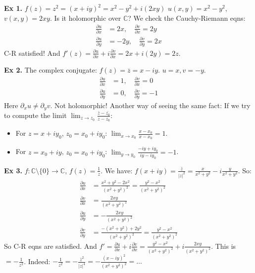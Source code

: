 \begin{example}
\textbf{Ex 1.} $f(z) = z^{2} = (x+iy)^{2} = x^{2} - y^{2} + i(2xy)$
$u(x,y) = x^{2} - y^{2}$, $v(x,y) = 2xy$.
Is it holomorphic over $\mathbb{C}$? We check the Cauchy-Riemann eqns:
\begin{align*}
\frac{\partial u}{\partial x} &= 2x, \quad \frac{\partial v}{\partial x} = 2y \\
\frac{\partial u}{\partial y} &= -2y, \quad \frac{\partial v}{\partial y} = 2x
\end{align*}
C-R satisfied! And $f'(z) = \frac{\partial u}{\partial x} + i\frac{\partial v}{\partial x} = 2x + i(2y) = 2z$.

\textbf{Ex 2.} The complex conjugate: $f(z) = \overline{z} = x - iy$.
$u = x, v = -y$.
\begin{align*}
\frac{\partial u}{\partial x} &= 1, \quad \frac{\partial v}{\partial x} = 0 \\
\frac{\partial u}{\partial y} &= 0, \quad \frac{\partial v}{\partial y} = -1
\end{align*}
Here $\partial_x u \neq \partial_y v$. Not holomorphic!
Another way of seeing the same fact: If we try to compute the limit $\lim_{z \rightarrow z_{0}} \frac{\overline{z} - \overline{z_{0}}}{z - z_{0}}$:
\begin{itemize}
    \item For $z = x + iy_{0}$, $z_{0} = x_{0} + iy_{0}$: $\lim_{x \to x_{0}} \frac{x - x_{0}}{x - x_{0}} = 1$.
    \item For $z = x_{0} + iy$, $z_{0} = x_{0} + iy_{0}$: $\lim_{y \to y_{0}} \frac{-iy + iy_{0}}{iy - iy_{0}} = -1$.
\end{itemize}

\textbf{Ex 3.} $f: \mathbb{C} \setminus \{0\} \to \mathbb{C}$, $f(z) = \frac{1}{z}$.
We have: $f(x+iy) = \frac{\overline{z}}{|z|^{2}} = \frac{x}{x^{2}+y^{2}} - i\frac{y}{x^{2}+y^{2}}$.
So:
\begin{align*}
\frac{\partial u}{\partial x} &= \frac{x^{2}+y^{2} - 2x^{2}}{(x^{2}+y^{2})^{2}} = \frac{y^2-x^2}{(x^2+y^2)^2} \\
\frac{\partial v}{\partial x} &= \frac{2xy}{(x^{2}+y^{2})^{2}} \\
\frac{\partial u}{\partial y} &= -\frac{2xy}{(x^{2}+y^{2})^{2}} \\
\frac{\partial v}{\partial y} &= \frac{-(x^{2}+y^{2}) + 2y^{2}}{(x^{2}+y^{2})^{2}} = \frac{y^2-x^2}{(x^2+y^2)^2}
\end{align*}
So C-R eqns are satisfied.
And $f' = \frac{\partial u}{\partial x} + i\frac{\partial v}{\partial x} = \frac{y^{2}-x^{2}}{(x^{2}+y^{2})^{2}} + i\frac{2xy}{(x^{2}+y^{2})^{2}}$.
This is $= -\frac{1}{z^{2}}$. Indeed: $-\frac{1}{z^{2}} = -\frac{\overline{z}^{2}}{|z|^{4}} = -\frac{(x-iy)^{2}}{(x^{2}+y^{2})^{2}} = \dots$


\end{example}

